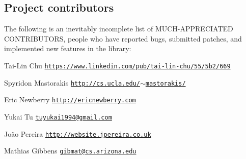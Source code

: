 \subsection*{Project contributors}

The following is an inevitably incomplete list of M\+U\+C\+H-\/\+A\+P\+P\+R\+E\+C\+I\+A\+T\+ED C\+O\+N\+T\+R\+I\+B\+U\+T\+O\+RS, people who have reported bugs, submitted patches, and implemented new features in the library\+:


\begin{DoxyItemize}
\item Tai-\/\+Lin Chu \href{https://www.linkedin.com/pub/tai-lin-chu/55/5b2/669}{\tt https\+://www.\+linkedin.\+com/pub/tai-\/lin-\/chu/55/5b2/669}
\item Spyridon Mastorakis \href{http://cs.ucla.edu/~mastorakis/}{\tt http\+://cs.\+ucla.\+edu/$\sim$mastorakis/}
\item Eric Newberry \href{http://ericnewberry.com}{\tt http\+://ericnewberry.\+com}
\item Yukai Tu \href{mailto:tuyukai1994@gmail.com}{\tt tuyukai1994@gmail.\+com}
\item João Pereira \href{http://website.jpereira.co.uk}{\tt http\+://website.\+jpereira.\+co.\+uk}
\item Mathias Gibbens \href{mailto:gibmat@cs.arizona.edu}{\tt gibmat@cs.\+arizona.\+edu} 
\end{DoxyItemize}